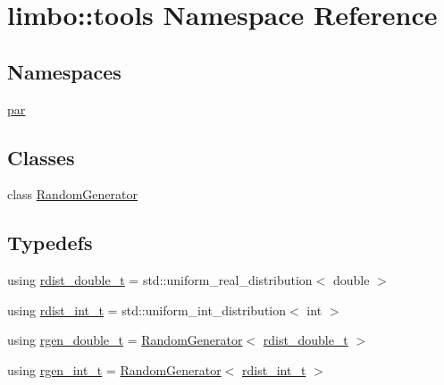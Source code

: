 \hypertarget{namespacelimbo_1_1tools}{}\section{limbo\+:\+:tools Namespace Reference}
\label{namespacelimbo_1_1tools}
\subsection*{Namespaces}
\begin{DoxyCompactItemize}
\item 
 \hyperlink{namespacelimbo_1_1tools_1_1par}{par}
\end{DoxyCompactItemize}
\subsection*{Classes}
\begin{DoxyCompactItemize}
\item 
class \hyperlink{classlimbo_1_1tools_1_1_random_generator}{Random\+Generator}
\end{DoxyCompactItemize}
\subsection*{Typedefs}
\begin{DoxyCompactItemize}
\item 
using \hyperlink{group__tools_gab2609bfef1e3bdb8b44c0d6c8c139927}{rdist\+\_\+double\+\_\+t} = std\+::uniform\+\_\+real\+\_\+distribution$<$ double $>$
\item 
using \hyperlink{group__tools_gacb322b4600b2e500dbcd24661a749f49}{rdist\+\_\+int\+\_\+t} = std\+::uniform\+\_\+int\+\_\+distribution$<$ int $>$
\item 
using \hyperlink{group__tools_gacdb2963659056fc5fa9f94405f59a851}{rgen\+\_\+double\+\_\+t} = \hyperlink{classlimbo_1_1tools_1_1_random_generator}{Random\+Generator}$<$ \hyperlink{group__tools_gab2609bfef1e3bdb8b44c0d6c8c139927}{rdist\+\_\+double\+\_\+t} $>$
\item 
using \hyperlink{group__tools_ga3df78ebcb864be91e73e840bb42b9208}{rgen\+\_\+int\+\_\+t} = \hyperlink{classlimbo_1_1tools_1_1_random_generator}{Random\+Generator}$<$ \hyperlink{group__tools_gacb322b4600b2e500dbcd24661a749f49}{rdist\+\_\+int\+\_\+t} $>$
\end{DoxyCompactItemize}
